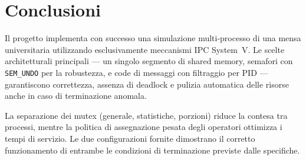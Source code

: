 \documentclass[a4paper,12pt]{article}
\begin{document}
\section{Conclusioni}

Il progetto implementa con successo una simulazione multi-processo di
una mensa universitaria utilizzando esclusivamente meccanismi IPC
System~V. Le scelte architetturali principali --- un singolo segmento
di shared memory, semafori con \texttt{SEM\_UNDO} per la robustezza,
e code di messaggi con filtraggio per PID --- garantiscono correttezza,
assenza di deadlock e pulizia automatica delle risorse anche in caso
di terminazione anomala.

La separazione dei mutex (generale, statistiche, porzioni) riduce la
contesa tra processi, mentre la politica di assegnazione pesata degli
operatori ottimizza i tempi di servizio. Le due configurazioni fornite
dimostrano il corretto funzionamento di entrambe le condizioni di
terminazione previste dalle specifiche.
\end{document}
